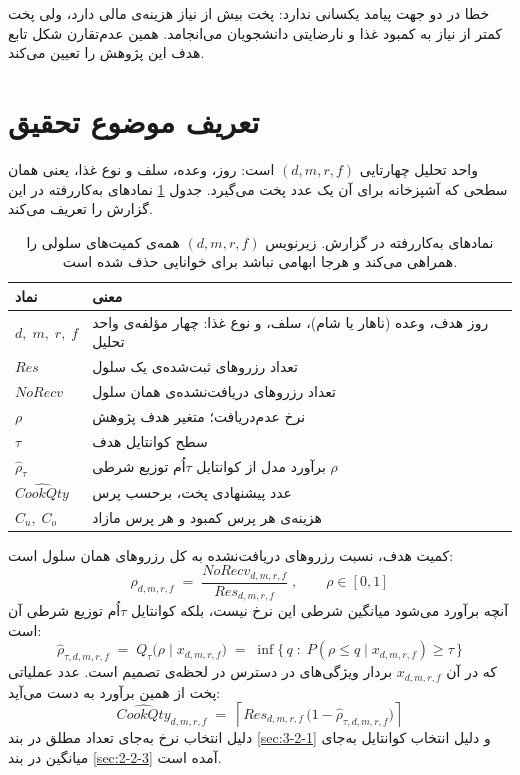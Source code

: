 خطا در دو جهت پیامد یکسانی ندارد: پخت بیش از نیاز هزینه‌ی مالی دارد، ولی پخت کمتر از نیاز
به کمبود غذا و نارضایتی دانشجویان می‌انجامد. همین عدم‌تقارن شکل تابع هدف این پژوهش را
تعیین می‌کند.

\section{تعریف موضوع تحقیق}
\label{sec:1-4}

واحد تحلیل چهارتایی $(d,m,r,f)$ است: روز، وعده، سلف و نوع غذا، یعنی همان سطحی که آشپزخانه
برای آن یک عدد پخت می‌گیرد. جدول \ref{tab:symbols} نمادهای به‌کاررفته در این گزارش را
تعریف می‌کند.

\begin{table}[!ht]
\centering
\footnotesize
\singlespacing
\renewcommand{\arraystretch}{1.1}
\caption[نمادهای به‌کاررفته در گزارش]{%
نمادهای به‌کاررفته در گزارش. زیرنویس $(d,m,r,f)$ همه‌ی کمیت‌های سلولی را همراهی می‌کند و
هرجا ابهامی نباشد برای خوانایی حذف شده است.}
\label{tab:symbols}
\vspace{2mm}
\begin{tabular}{|p{2.3cm}|p{10.2cm}|}
\hline
\textbf{نماد} & \textbf{معنی} \\
\hline
$d,\;m,\;r,\;f$ & روز هدف، وعده (ناهار یا شام)، سلف، و نوع غذا: چهار مؤلفه‌ی واحد تحلیل \\
\hline
$Res$ & تعداد رزروهای ثبت‌شده‌ی یک سلول \\
\hline
$NoRecv$ & تعداد رزروهای دریافت‌نشده‌ی همان سلول \\
\hline
$\rho$ & نرخ عدم‌دریافت؛ متغیر هدف پژوهش \\
\hline
$\tau$ & سطح کوانتایل هدف \\
\hline
$\hat\rho_{\tau}$ & برآورد مدل از کوانتایل $\tau$اُم توزیع شرطی $\rho$ \\
\hline
$\widehat{CookQty}$ & عدد پیشنهادی پخت، برحسب پرس \\
\hline
$C_u,\;C_o$ & هزینه‌ی هر پرس کمبود و هر پرس مازاد \\
\hline
\end{tabular}
\end{table}

کمیت هدف، نسبت رزروهای دریافت‌نشده به کل رزروهای همان سلول است:
\begin{equation}
\rho_{d,m,r,f} \;=\; \frac{NoRecv_{d,m,r,f}}{Res_{d,m,r,f}}\;,
\qquad \rho \in [0,1]
\label{eq:rho}
\end{equation}
آنچه برآورد می‌شود میانگین شرطی این نرخ نیست، بلکه کوانتایل $\tau$اُم توزیع شرطی آن است:
\begin{equation}
\hat\rho_{\tau,d,m,r,f} \;=\; Q_{\tau}\big(\rho \mid x_{d,m,r,f}\big)
\;=\; \inf\big\{\,q \;:\; P(\rho \le q \mid x_{d,m,r,f}) \ge \tau \,\big\}
\label{eq:quantile-target}
\end{equation}
که در آن $x_{d,m,r,f}$ بردار ویژگی‌های در دسترس در لحظه‌ی تصمیم است. عدد عملیاتی پخت از
همین برآورد به دست می‌آید:
\begin{equation}
\widehat{CookQty}_{d,m,r,f} \;=\; \left\lceil Res_{d,m,r,f}\,
\big(1-\hat\rho_{\tau,d,m,r,f}\big) \right\rceil
\label{eq:cookqty-intro}
\end{equation}
دلیل انتخاب نرخ به‌جای تعداد مطلق در بند \ref{sec:3-2-1} و دلیل انتخاب کوانتایل به‌جای
میانگین در بند \ref{sec:2-2-3} آمده است.

